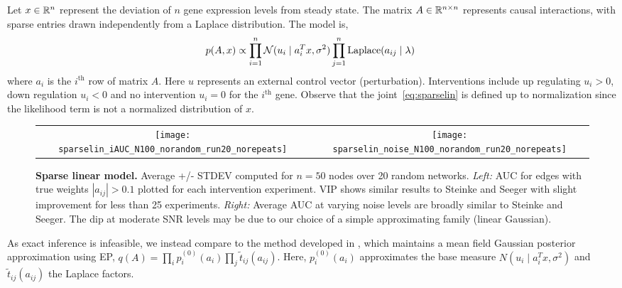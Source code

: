 Let $x\in\mathbb{R}^n$ represent the deviation of $n$ gene expression levels
from steady state.  The matrix $A\in\mathbb{R}^{n\times n}$ represents causal
interactions, with sparse entries drawn independently from a Laplace
distribution.  The model is,
\begin{equation}\label{eq:sparselin}
  \!\!\!p(A,x) \propto \prod_{i=1}^n \mathcal{N}(u_i \mid a_i^T
    x, \sigma^2) \prod_{j=1}^n \textrm{Laplace}(a_{ij} \mid \lambda) 
\end{equation}
where $a_i$ is the $i^{\text{th}}$ row of matrix $A$.  Here $u$
represents an external control vector (perturbation).  Interventions
include up regulating $u_i>0$, down regulation $u_i<0$ and no
intervention $u_i=0$ for the $i^{\text{th}}$ gene.  Observe that the
joint~\eqref{eq:sparselin} is defined up to normalization since the
likelihood term is not a normalized distribution of $x$.

\begin{figure}[t]
  \centering
  \begin{tabular}{cc}
    \hspace{-3mm}\texttt{[image: sparselin\_iAUC\_N100\_norandom\_run20\_norepeats]} &
    \hspace{-3mm}\texttt{[image: sparselin\_noise\_N100\_norandom\_run20\_norepeats]}
  \end{tabular}
  \caption{\small\textbf{Sparse linear model.} Average +/- STDEV
    computed for $n=50$ nodes over 20 random networks.  \emph{Left:}
    AUC for edges with true weights $|a_{ij}|>0.1$ plotted for each
    intervention experiment.  VIP shows similar results to Steinke and
    Seeger with slight improvement for less than 25 experiments.
    \emph{Right:} Average AUC at varying noise levels are broadly
    similar to Steinke and Seeger. The dip at moderate SNR levels may
    be due to our choice of a simple approximating family (linear
    Gaussian).}
  
  \label{fig:sparselin}
\end{figure}

As exact inference is infeasible, we instead compare to the method
developed in \cite{steinke2007experimental, seeger2008bayesian}, which
maintains a mean field Gaussian posterior approximation using EP,
\mbox{$q(A) = \prod_i p_i^{(0)}(a_i) \prod_j
  \widetilde{t}_{ij}(a_{ij})$}.  Here, $p^{(0)}_i(a_i)$ approximates
the base measure \mbox{$N(u_i \mid a_i^T x, \sigma^2)$} and
\mbox{$\widetilde{t}_{ij}(a_{ij})$} the Laplace factors.

